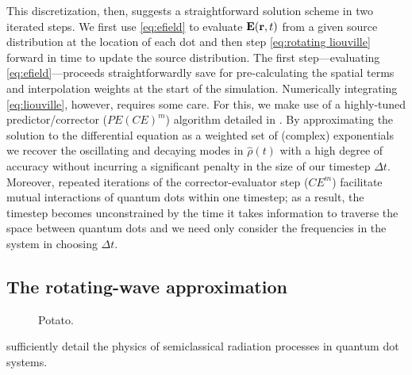 \documentclass[conference]{IEEEtran}
\begin{document}
This discretization, then, suggests a straightforward solution scheme in two iterated steps.
We first use \cref{eq:efield} to evaluate $\vb{E}(\vb{r}, t)$ from a given source distribution at the location of each dot and then step \cref{eq:rotating liouville} forward in time to update the source distribution.
The first step---evaluating \cref{eq:efield}---proceeds straightforwardly save for pre-calculating the spatial terms and interpolation weights at the start of the simulation.
Numerically integrating \cref{eq:liouville}, however, requires some care.
For this, we make use of a highly-tuned predictor/corrector ($PE(CE)^m$) algorithm detailed in \cite{Glaser2009}.
By approximating the solution to the differential equation as a weighted set of (complex) exponentials we recover the oscillating and decaying modes in $\hat{\rho}(t)$ with a high degree of accuracy without incurring a significant penalty in the size of our timestep $\Delta t$.
Moreover, repeated iterations of the corrector-evaluator step ($CE^m$) facilitate mutual interactions of quantum dots within one timestep; as a result, the timestep becomes unconstrained by the time it takes information to traverse the space between quantum dots and we need only consider the frequencies in the system in choosing $\Delta t$.

\subsection{The rotating-wave approximation}
\begin{figure}
  \centering
  
  \caption{\label{fig:frame comparison}Potato.}
\end{figure}

 sufficiently detail the physics of semiclassical radiation processes in quantum dot systems.
\end{document}
